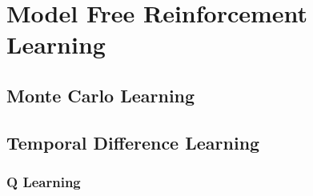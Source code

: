 \section{Model Free Reinforcement Learning}
\label{sec:mf_rl}

\subsection{Monte Carlo Learning}

\subsection{Temporal Difference Learning}

\subsubsection{Q Learning}
